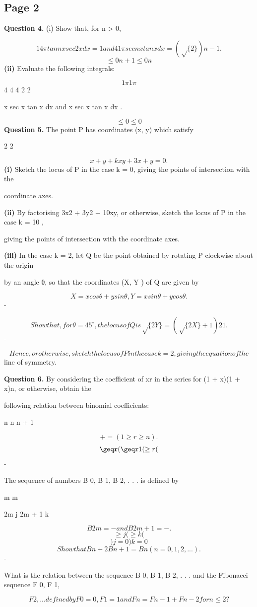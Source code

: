 \documentclass[12pt]{article}
\begin{document}
\subsection*{Page 2}
\begin{flushleft}
\bigskip\textbf{Question 4.} (i) Show that, for n > 0,\par
\[1 4 \pi tann x sec 2 x dx = 1 and 4 1 \pi secnx tan x dx = (\sqrt\{2\})n - 1 .\]
\[\leq0 n + 1 \leq0 n\]
\textbf{(ii)} Evaluate the following integrals:\par
\[1 \pi 1 \pi\]
4 4 4 2 2\par
x sec x tan x dx and x sec x tan x dx .\par
\[\leq0 \leq0\]
\bigskip\textbf{Question 5.} The point P has coordinates (x, y) which satisfy\par
2 2\par
\[x + y + kxy + 3x + y = 0 .\]
\textbf{(i)} Sketch the locus of P in the case k = 0, giving the points of intersection with the\par
coordinate axes.\par
\textbf{(ii)} By factorising 3x2 + 3y2 + 10xy, or otherwise, sketch the locus of P in the case k = 10 ,\par
giving the points of intersection with the coordinate axes.\par
\textbf{(iii)} In the case k = 2, let Q be the point obtained by rotating P clockwise about the origin\par
by an angle θ, so that the coordinates (X, Y ) of Q are given by\par
\[X = x cos θ + y sin θ , Y = x sin θ + y cos θ .\]
-\par
\[Show that, for θ = 45 ^\circ , the locus of Q is \sqrt\{2Y\} = (\sqrt\{2X\} + 1)2 1.\]
-\par
\[Hence, or otherwise, sketch the locus of P in the case k = 2, giving the equation of the\]
line of symmetry.\par
\bigskip\textbf{Question 6.} By considering the coefficient of xr in the series for (1 + x)(1 + x)n, or otherwise, obtain the\par
following relation between binomial coefficients:\par
n n n + 1\par
\[+ = (1 \geq r \geq n).\]
\[\geqr( \geqr 1( \geq r (\]
-\par
The sequence of numbers B 0, B 1, B 2, . . . is defined by\par
m m\par
2m j 2m + 1 k\par
\[B 2m = - and B 2m+1 = - .\]
\[\geq j ( \geq k (\]
\[)j=0 )k=0\]
\[Show that B n+2 B n+1 = B n (n = 0, 1, 2, . . . ).\]
-\par
What is the relation between the sequence B 0, B 1, B 2, . . . and the Fibonacci sequence F 0, F 1,\par
\[F 2, . . . defined by F 0 = 0, F 1 = 1 and F n = F n-1 + F n-2 for n \leq 2?\]
\end{flushleft}
\end{document}
